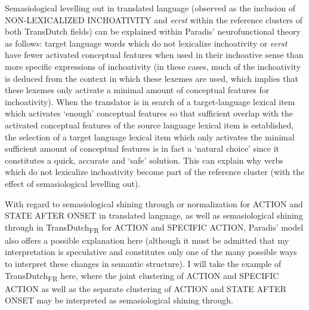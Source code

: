 Semasiological levelling out in translated language (observed as the inclusion of NON-LEXICALIZED INCHOATIVITY and \textit{eerst} within the reference clusters of both TransDutch fields) can be explained within Paradis’ neurofunctional theory as follows: target language words which do not lexicalize inchoativity or \textit{eerst} have fewer activated conceptual features when used in their inchoative sense than more specific expressions of inchoativity (in these cases, much of the inchoativity is deduced from the context in which these lexemes are used, which implies that these lexemes only activate a minimal amount of conceptual features for inchoativity). When the translator is in search of a target-language lexical item which activates ‘enough’ conceptual features so that sufficient overlap with the activated conceptual features of the source language lexical item is established, the selection of a target language lexical item which only activates the minimal sufficient amount of conceptual features is in fact a ‘natural choice’ since it constitutes a quick, accurate and ‘safe’ solution. This can explain why verbs which do not lexicalize inchoativity become part of the reference cluster (with the effect of semasiological levelling out).

With regard to semasiological shining through or normalization for ACTION and STATE AFTER ONSET in translated language, as well as semasiological shining through in TransDutch\textsubscript{FR} for ACTION and SPECIFIC ACTION, Paradis’ model also offers a possible explanation here (although it must be admitted that my interpretation is speculative and constitutes only one of the many possible ways to interpret these changes in semantic structure). I will take the example of TransDutch\textsubscript{FR} here, where the joint clustering of ACTION and SPECIFIC ACTION as well as the separate clustering of ACTION and STATE AFTER ONSET may be interpreted as semasiological shining through.

